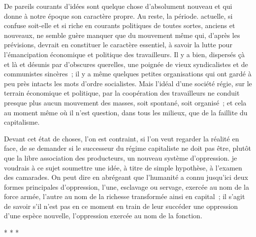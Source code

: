 \documentclass[french,twoside]{book} %
\begin{document}
De pareils courants d'idées sont quelque chose d'absolument nouveau et qui donne à notre époque son caractère propre. Au reste, la période. actuelle, si confuse soit-elle et si riche en courants politiques de toutes sortes, anciens et nouveaux, ne semble guère manquer que du mouvement même qui, d'après les prévisions, devrait en constituer le caractère essentiel, à savoir la lutte pour l'émancipation économique et politique des travailleurs. Il y a bien, dispersés çà et là et désunis par d'obscures querelles, une poignée de vieux syndicalistes et de communistes sincères ; il y a même quelques petites organisations qui ont gardé à peu près intacts les mots d'ordre socialistes. Mais l'idéal d'une société régie, sur le terrain économique et politique, par la coopération des travailleurs ne conduit presque plus aucun mouvement des masses, soit spontané, soit organisé ; et cela au moment même où il n'est question, dans tous les milieux, que de la faillite du capitalisme.\par
Devant cet état de choses, l'on est contraint, si l'on veut regarder la réalité en face, de se demander si le successeur du régime capitaliste ne doit pas être, plutôt que la libre association des producteurs, un nouveau système d'oppression. je voudrais à ce sujet soumettre une idée, à titre de simple hypothèse, à l'examen des camarades. On peut dire en abrégeant que l'humanité a connu jusqu'ici deux formes principales d'oppression, l'une, esclavage ou servage, exercée au nom de la force armée, l'autre au nom de la richesse transformée ainsi en capital ; il s'agit de savoir s'il n'est pas en ce moment en train de leur succéder une oppression d'une espèce nouvelle, l'oppression exercée au nom de la fonction.\par

\begin{center}
\noindent \centerline{* * *}\par
\end{center}
\end{document}
